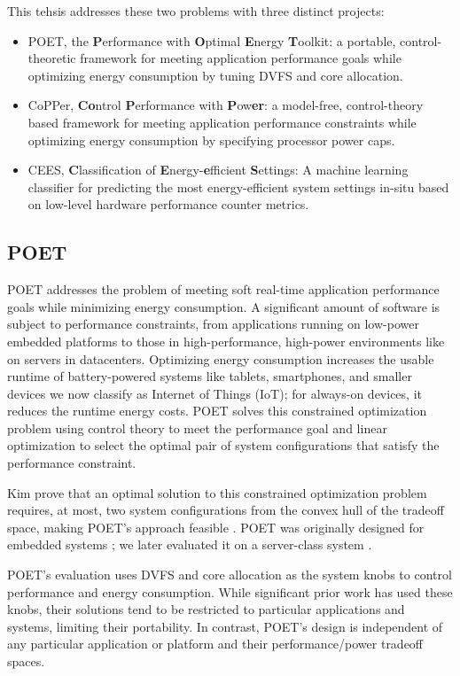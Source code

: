 This tehsis addresses these two problems with three distinct projects:
\begin{itemize}
\item POET, the \textbf{P}erformance with \textbf{O}ptimal \textbf{E}nergy \textbf{T}oolkit: a portable, control-theoretic framework for meeting application performance goals while optimizing energy consumption by tuning DVFS and core allocation.
\item CoPPer, \textbf{Co}ntrol \textbf{P}erformance with \textbf{P}ow\textbf{er}: a model-free, control-theory based framework for meeting application performance constraints while optimizing energy consumption by specifying processor power caps.
\item CEES, \textbf{C}lassification of \textbf{E}nergy-\textbf{e}fficient \textbf{S}ettings: A machine learning classifier for predicting the most energy-efficient system settings in-situ based on low-level hardware performance counter metrics.
\end{itemize}


\subsection{POET}

POET addresses the problem of meeting soft real-time application performance goals while minimizing energy consumption.
A significant amount of software is subject to performance constraints, from applications running on low-power embedded platforms to those in high-performance, high-power environments like on servers in datacenters.
Optimizing energy consumption increases the usable runtime of battery-powered systems like tablets, smartphones, and smaller devices we now classify as Internet of Things (IoT); for always-on devices, it reduces the runtime energy costs.
POET solves this constrained optimization problem using control theory to meet the performance goal and linear optimization to select the optimal pair of system configurations that satisfy the performance constraint.

Kim \etal prove that an optimal solution to this constrained optimization problem requires, at most, two system configurations from the convex hull of the tradeoff space, making POET's approach feasible \cite{kim-cpsna2015}.
POET was originally designed for embedded systems \cite{POET,ImesMS}; we later evaluated it on a server-class system \cite{POETMCSoC}.

POET's evaluation uses DVFS and core allocation as the system knobs to control performance and energy consumption.
While significant prior work has used these knobs, their solutions tend to be restricted to particular applications and systems, limiting their portability.
In contrast, POET's design is independent of any particular application or platform and their performance/power tradeoff spaces.

